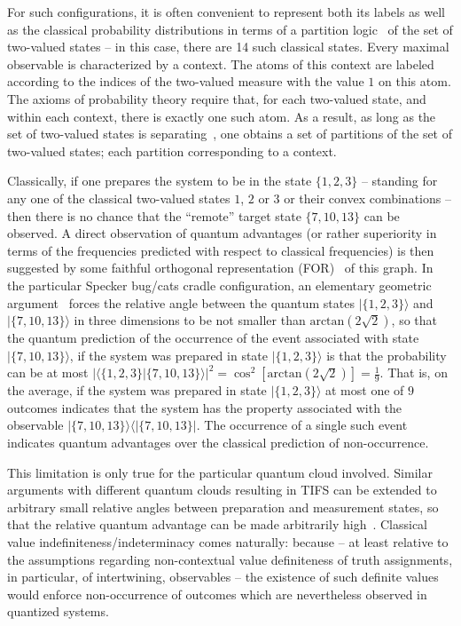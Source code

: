 \documentclass[%
  twocolumn,
 showpacs,
 showkeys,
 preprintnumbers,
 amsmath,amssymb,
 aps,
  pra,
  longbibliography,
 ]{revtex4-1}
\begin{document}
For such configurations, it is often convenient to represent both its labels as well as
the classical probability distributions in terms of a partition logic~\citep{svozil-2001-eua}
of the set of two-valued states -- in this case, there are 14 such classical states. Every maximal observable is characterized by a context.
The atoms of this context are labeled according to the indices of the two-valued measure with the value $1$ on this atom.
The axioms of probability theory require that, for each two-valued state,
and within each context,
there is exactly one such atom.
As a result, as long as the set of two-valued states is separating~\cite[Theorem~0]{kochen1},
one obtains a set of partitions of the set of two-valued states; each partition corresponding to a context.

Classically, if one prepares the system to be in the state $\{1,2,3\}$ -- standing for any one of the classical two-valued states $1$, $2$ or $3$
or their convex combinations -- then there is no chance that the ``remote'' target state $\{ 7,10,13 \}$ can be observed.
A direct observation of  quantum advantages
(or rather superiority in terms of the frequencies predicted with respect to classical frequencies) is then suggested by
some faithful orthogonal representation (FOR)~\citep{lovasz-89,Parsons-1989,Cabello-2010-ncoptaa,Portillo-2015}
of this graph. In the particular Specker bug/cats cradle configuration,
an elementary geometric argument~\citep{cabello-1994,Cabello-1996-diss}
forces the relative angle between the quantum states
$\vert \{1,2,3\} \rangle$
and
$\vert \{7,10,13\} \rangle$
in three dimensions to be not smaller than $\text{arctan} \left(2\sqrt{2}\right)$,
so that the quantum prediction of the occurrence of the event associated with state $\vert \{7,10,13\} \rangle$,
if the system was prepared in state
$\vert \{1,2,3\} \rangle$
is that the probability can be at most
$\vert \langle \{1,2,3\} \vert \{7,10,13\}  \rangle \vert^2 =
\cos^2 \left[
\text{arctan} \left(2\sqrt{2}\right)
\right]
=\frac{1}{9}$.
That is, on the average, if the system was prepared in
state
$\vert \{1,2,3\} \rangle$
at most one of $9$ outcomes indicates that the system has the property associated with the
observable
 $\vert \{7,10,13\} \rangle \langle \vert \{7,10,13\}\vert$.
The occurrence of a single such event indicates quantum advantages over the classical prediction of non-occurrence.

This limitation is only true for the particular quantum cloud involved.
Similar arguments with different quantum clouds resulting in TIFS
can be extended to arbitrary small relative angles between preparation and measurement states,
so that the relative quantum advantage
can be made arbitrarily high~\citep{2015-AnalyticKS,Ramanathan-18}.
Classical value indefiniteness/indeterminacy comes naturally:
because -- at least relative to the assumptions regarding non-contextual value definiteness
of truth assignments, in particular, of intertwining, observables --
the existence of such definite values would enforce
non-occurrence of outcomes which are nevertheless observed in quantized systems.
\end{document}
